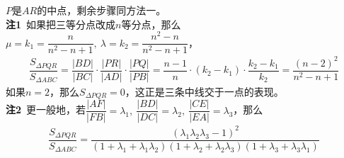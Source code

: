 \begin{enumerate}[label={【\textbf{例\thechapter.\arabic*}】},
 leftmargin=\inteval{\myenumleftmargin}pt,
 itemsep=\inteval{\myenumitempsep}pt,
 itemindent=\inteval{\myenumitemindent}pt]
$ P $是$ AR $的中点，剩余步骤同方法一。\\
\textbf{注1}\ 如果把三等分点改成$ n $等分点，那么$     \mu=k_1=\dfrac{n}{n^2-n+1},\ \lambda=k_2=\dfrac{n^2-n}{n^2-n+1} $，
\begin{gather*}
    \dfrac{S_{\Delta PQR}}{S_ {\Delta ABC}} =\dfrac{|BD|}{|BC|}\cdot
    \dfrac{|PR|}{|AD|} \cdot \dfrac{|PQ|}{|PB|}=\dfrac{n-1}{n}
    \cdot(k_2-k_1)\cdot\dfrac{k_2-k_1}{k_2}=\dfrac{(n-2)^2}{n^2-n+1}
\end{gather*}
如果$ n=2 $，那么$ S_{\Delta PQR} =0 $，这正是三条中线交于一点的表现。\\
\textbf{注2}\ 更一般地，若$ \dfrac{|AF|}{|FB|}=\lambda_1,\ 
\dfrac{|BD|}{|DC|}=\lambda_2,\ \dfrac{|CE|}{|EA|}=\lambda_3 $，那么
\begin{align*}
    \dfrac{S_{\Delta PQR}}{S_ {\Delta ABC}} =\dfrac{(\lambda_1\lambda_2
        \lambda_3-1)^2}{(1+\lambda_1+\lambda_1\lambda_2)
        (1+\lambda_2+\lambda_2\lambda_3)(1+\lambda_3+\lambda_3\lambda_1)}
\end{align*}


\end{enumerate}

